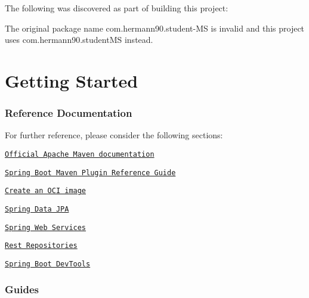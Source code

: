 The following was discovered as part of building this project\+:


\begin{DoxyItemize}
\item The original package name \textquotesingle{}com.\+hermann90.\+student-\/\+MS\textquotesingle{} is invalid and this project uses \textquotesingle{}com.\+hermann90.\+student\+MS\textquotesingle{} instead.
\end{DoxyItemize}

\section*{Getting Started}

\subsubsection*{Reference Documentation}

For further reference, please consider the following sections\+:


\begin{DoxyItemize}
\item \href{https://maven.apache.org/guides/index.html}{\tt Official Apache Maven documentation}
\item \href{https://docs.spring.io/spring-boot/docs/2.4.3/maven-plugin/reference/html/}{\tt Spring Boot Maven Plugin Reference Guide}
\item \href{https://docs.spring.io/spring-boot/docs/2.4.3/maven-plugin/reference/html/#build-image}{\tt Create an O\+CI image}
\item \href{https://docs.spring.io/spring-boot/docs/2.4.3/reference/htmlsingle/#boot-features-jpa-and-spring-data}{\tt Spring Data J\+PA}
\item \href{https://docs.spring.io/spring-boot/docs/2.4.3/reference/htmlsingle/#boot-features-webservices}{\tt Spring Web Services}
\item \href{https://docs.spring.io/spring-boot/docs/2.4.3/reference/htmlsingle/#howto-use-exposing-spring-data-repositories-rest-endpoint}{\tt Rest Repositories}
\item \href{https://docs.spring.io/spring-boot/docs/2.4.3/reference/htmlsingle/#using-boot-devtools}{\tt Spring Boot Dev\+Tools}
\end{DoxyItemize}

\subsubsection*{Guides}

